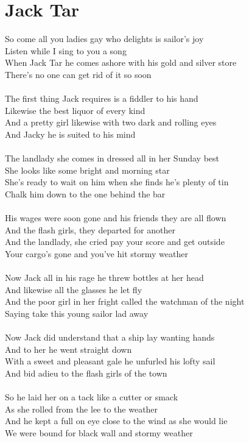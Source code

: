 \documentclass[letterpaper,9pt]{article}
\begin{document}
\newpage
\section{Jack Tar}
\noindent
So come all you ladies gay who delights is sailor’s joy
\\Listen while I sing to you a song
\\When Jack Tar he comes ashore with his gold and silver store
\\There’s no one can get rid of it so soon
\\
\\The first thing Jack requires is a fiddler to his hand
\\Likewise the best liquor of every kind
\\And a pretty girl likewise with two dark and rolling eyes
\\And Jacky he is suited to his mind
\\
\\The landlady she comes in dressed all in her Sunday best
\\She looks like some bright and morning star
\\She’s ready to wait on him when she finds he’s plenty of tin
\\Chalk him down to the one behind the bar
\\
\\His wages were soon gone and his friends they are all flown
\\And the flash girls, they departed for another
\\And the landlady, she cried pay your score and get outside
\\Your cargo’s gone and you’ve hit stormy weather
\\
\\Now Jack all in his rage he threw bottles at her head
\\And likewise all the glasses he let fly
\\And the poor girl in her fright called the watchman of the night
\\Saying take this young sailor lad away
\\
\\Now Jack did understand that a ship lay wanting hands
\\And to her he went straight down
\\With a sweet and pleasant gale he unfurled his lofty sail
\\And bid adieu to the flash girls of the town
\\
\\So he laid her on a tack like a cutter or smack
\\As she rolled from the lee to the weather
\\And he kept a full on eye close to the wind as she would lie
\\We were bound for black wall and stormy weather
\end{document}
